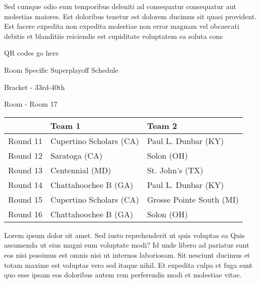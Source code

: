 \documentclass{article}%
\begin{document}
\newline%
    Sed cumque odio eum temporibus deleniti ad consequatur consequatur aut molestias maiores. Est doloribus tenetur est dolorem ducimus sit quasi provident. Est facere expedita non expedita molestiae non error magnam vel obcaecati debitis et blanditiis reiciendis est cupiditate voluptatem ea soluta cons%
\vspace*{140pt}%
\begin{center}%
\begin{Huge}%
QR codes go here%
\end{Huge}%
\end{center}%
\newpage%
\begin{center}%
\begin{Huge}%
Room Specific Superplayoff Schedule%
\end{Huge}%
\vspace*{8pt}%
\linebreak%
\begin{Large}%
Bracket {-} 33rd{-}40th%
\end{Large}%
\vspace*{8pt}%
\linebreak%
\vspace*{8pt}%
\begin{Large}%
Room {-} Room 17%
\end{Large}%
\end{center}%
%
\begin{tabularx}{\textwidth}{|c|Y|Y|}%
\hline%
&Team 1&Team 2\\%
\hline%
Round 11&Cupertino Scholars (CA)&Paul L. Dunbar (KY)\\%
Round 12&Saratoga (CA)&Solon (OH)\\%
Round 13&Centennial (MD)&St. John's (TX)\\%
Round 14&Chattahoochee B (GA)&Paul L. Dunbar (KY)\\%
Round 15&Cupertino Scholars (CA)&Grosse Pointe South (MI)\\%
Round 16&Chattahoochee B (GA)&Solon (OH)\\%
\hline%
\end{tabularx}%
\vspace*{8pt}%
\newline%
    Lorem ipsum dolor sit amet. Sed iusto reprehenderit ut quis voluptas ea Quis assumenda ut eius magni eum voluptate modi? Id unde libero ad pariatur sunt eos nisi possimus est omnis nisi ut internos laboriosam. Sit nesciunt ducimus et totam maxime est voluptas vero sed itaque nihil. Et expedita culpa et fuga sunt quo esse ipsam eos doloribus autem rem perferendis modi et molestiae vitae.\newline%
\end{document}

